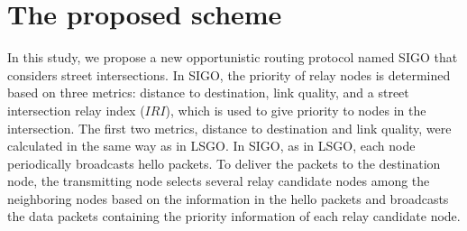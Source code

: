 \documentclass[conference]{IEEEtran}
\begin{document}






\section{The proposed scheme}
\label{SIGO}
In this study, we propose a new opportunistic routing protocol named SIGO that considers street intersections. 
In SIGO, the priority of relay nodes is determined based on three metrics: distance to destination, link quality, and a street intersection relay index ($IRI$), which is used to give priority to nodes in the intersection.
The first two metrics, distance to destination and link quality, were calculated in the same way as in LSGO. 
In SIGO, as in LSGO, each node periodically broadcasts hello packets. To deliver the packets to the destination node, the transmitting node selects several relay candidate nodes among the neighboring nodes based on the information in the hello packets and broadcasts the data packets containing the priority information of each relay candidate node.
\end{document}
